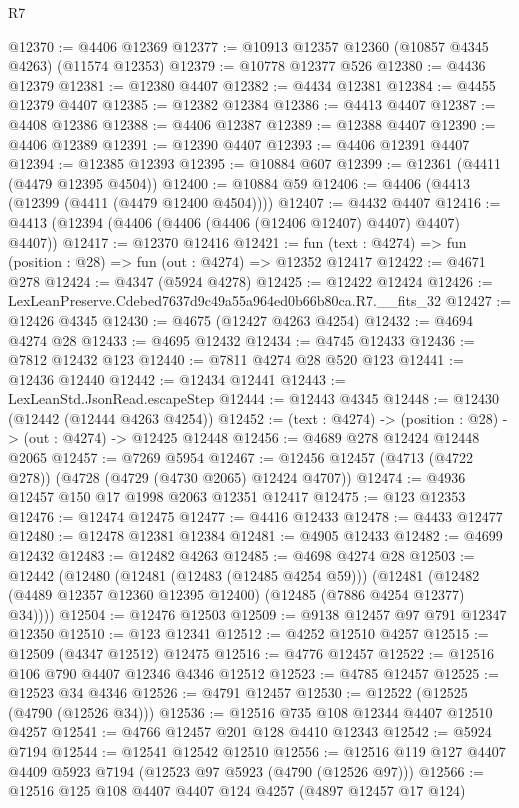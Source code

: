 \begin{lexlean}{R7}
\begin{coremodule}
@12370 := @4406 @12369
@12377 := @10913 @12357 @12360 (@10857 @4345 @4263) (@11574 @12353)
@12379 := @10778 @12377 @526
@12380 := @4436 @12379
@12381 := @12380 @4407
@12382 := @4434 @12381
@12384 := @4455 @12379 @4407
@12385 := @12382 @12384
@12386 := @4413 @4407
@12387 := @4408 @12386
@12388 := @4406 @12387
@12389 := @12388 @4407
@12390 := @4406 @12389
@12391 := @12390 @4407
@12393 := @4406 @12391 @4407
@12394 := @12385 @12393
@12395 := @10884 @607
@12399 := @12361 (@4411 (@4479 @12395 @4504))
@12400 := @10884 @59
@12406 := @4406 (@4413 (@12399 (@4411 (@4479 @12400 @4504))))
@12407 := @4432 @4407
@12416 := @4413 (@12394 (@4406 (@4406 (@4406 (@12406 @12407) @4407) @4407) @4407))
@12417 := @12370 @12416
@12421 := fun (text : @4274) => fun (position : @28) => fun (out : @4274) => @12352 @12417
@12422 := @4671 @278
@12424 := @4347 (@5924 @4278)
@12425 := @12422 @12424
@12426 := LexLeanPreserve.Cdebed7637d9c49a55a964ed0b66b80ca.R7.__fits_32
@12427 := @12426 @4345
@12430 := @4675 (@12427 @4263 @4254)
@12432 := @4694 @4274 @28
@12433 := @4695 @12432
@12434 := @4745 @12433
@12436 := @7812 @12432 @123
@12440 := @7811 @4274 @28 @520 @123
@12441 := @12436 @12440
@12442 := @12434 @12441
@12443 := LexLeanStd.JsonRead.escapeStep
@12444 := @12443 @4345
@12448 := @12430 (@12442 (@12444 @4263 @4254))
@12452 := (text : @4274) -> (position : @28) -> (out : @4274) -> @12425 @12448
@12456 := @4689 @278 @12424 @12448 @2065
@12457 := @7269 @5954
@12467 := @12456 @12457 (@4713 (@4722 @278)) (@4728 (@4729 (@4730 @2065) @12424 @4707))
@12474 := @4936 @12457 @150 @17 @1998 @2063 @12351 @12417
@12475 := @123 @12353
@12476 := @12474 @12475
@12477 := @4416 @12433
@12478 := @4433 @12477
@12480 := @12478 @12381 @12384
@12481 := @4905 @12433
@12482 := @4699 @12432
@12483 := @12482 @4263
@12485 := @4698 @4274 @28
@12503 := @12442
    (@12480
      (@12481 (@12483 (@12485 @4254 @59)))
      (@12481 (@12482 (@4489 @12357 @12360 @12395 @12400) (@12485 (@7886 @4254 @12377) @34))))
@12504 := @12476 @12503
@12509 := @9138 @12457 @97 @791 @12347 @12350
@12510 := @123 @12341
@12512 := @4252 @12510 @4257
@12515 := @12509 (@4347 @12512) @12475
@12516 := @4776 @12457
@12522 := @12516 @106 @790 @4407 @12346 @4346 @12512
@12523 := @4785 @12457
@12525 := @12523 @34 @4346
@12526 := @4791 @12457
@12530 := @12522 (@12525 (@4790 (@12526 @34)))
@12536 := @12516 @735 @108 @12344 @4407 @12510 @4257
@12541 := @4766 @12457 @201 @128 @4410 @12343
@12542 := @5924 @7194
@12544 := @12541 @12542 @12510
@12556 := @12516 @119 @127 @4407 @4409 @5923 @7194 (@12523 @97 @5923 (@4790 (@12526 @97)))
@12566 := @12516 @125 @108 @4407 @4407 @124 @4257 (@4897 @12457 @17 @124)

\end{coremodule}
\end{lexlean}
